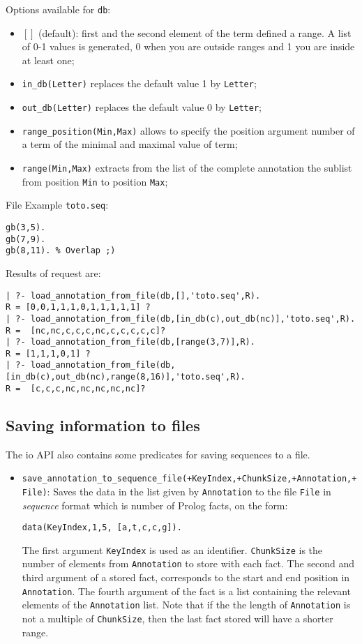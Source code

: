\documentclass{book}
\begin{document}
\begin{itemize}
Options available for \texttt{db}:
\begin{itemize}
\item $[]$ (default): first and the second element of the term defined a range. A list of 0-1 
values is generated, 0 when you are outside ranges and 1 you are inside at least one;
\item \texttt{in\_db(Letter)} replaces the default value 1 by \texttt{Letter};
\item \texttt{out\_db(Letter)} replaces the default value 0 by \texttt{Letter};
\item \texttt{range\_position(Min,Max)} allows to specify the position argument number of a term of the minimal and maximal value
of term;
\item \texttt{range(Min,Max)} extracts from the list of the complete annotation the sublist from position \texttt{Min} to
position \texttt{Max};
\end{itemize}
File Example \texttt{toto.seq}:
\begin{verbatim}
gb(3,5).
gb(7,9).
gb(8,11). % Overlap ;)
\end{verbatim}
Results of request are:
\begin{verbatim}
| ?- load_annotation_from_file(db,[],'toto.seq',R).
R = [0,0,1,1,1,0,1,1,1,1,1] ?
| ?- load_annotation_from_file(db,[in_db(c),out_db(nc)],'toto.seq',R).
R =  [nc,nc,c,c,c,nc,c,c,c,c,c]?
| ?- load_annotation_from_file(db,[range(3,7)],R).
R = [1,1,1,0,1] ?
| ?- load_annotation_from_file(db,[in_db(c),out_db(nc),range(8,16)],'toto.seq',R).
R =  [c,c,c,nc,nc,nc,nc,nc]?
\end{verbatim}


\end{itemize}

\subsection{Saving information to files}

The io API also contains some predicates for saving sequences to a
file. 

\begin{itemize}
\item
  \texttt{save\_annotation\_to\_sequence\_file(+KeyIndex,+ChunkSize,+Annotation,+File)}: 
Saves the data in the list given by \texttt{Annotation} to the file
\texttt{File} in \emph{sequence} format which is number of Prolog facts, on
the form:
\begin{verbatim}
data(KeyIndex,1,5, [a,t,c,c,g]).
\end{verbatim}
The first argument \texttt{KeyIndex} is used as an identifier. \texttt{ChunkSize} is the
number of elements from \texttt{Annotation} to store with each
fact. The second and third argument of a stored fact, corresponds to
the start and end position in \texttt{Annotation}. The fourth
argument of the fact is a list containing the relevant elements of the
\texttt{Annotation} list. Note that if the the length of
\texttt{Annotation} is not a multiple of \texttt{ChunkSize}, then the
last fact stored will have a shorter range.
\end{itemize}
\end{document}
